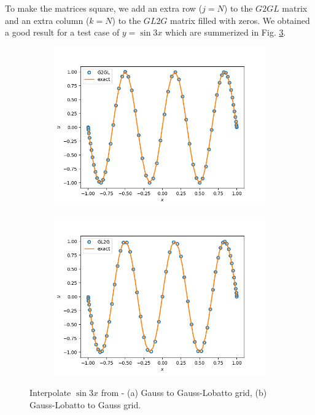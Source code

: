 \documentclass{article}
\begin{document}
To make the matrices square, we add an extra row ($j = N$) to the $G2GL$ matrix and an extra column ($k=N$) to the $GL2G$ matrix filled with zeros. 
We obtained a good result for a test case of $y = \sin{3x}$ which are summerized in Fig. \ref{fig:test_interpolants}.
\begin{figure}[H]
\centering
\begin{subfigure}{.5\textwidth}
  \centering
  \includegraphics[scale=0.4]{Figs/test_g2gl_interpolant.png}
 \subcaption{}
  \label{fig:202a}
\end{subfigure}%
\begin{subfigure}{.5\textwidth}
  \centering
  \includegraphics[scale=0.4]{Figs/test_gl2g_interpolant.png}
  \subcaption{}
  \label{fig:202b}
    \end{subfigure}
  \caption{Interpolate $\sin{3x}$ from - (a) Gauss to Gauss-Lobatto grid,  (b) Gauss-Lobatto to Gauss grid.}
\label{fig:test_interpolants}
\end{figure}
\end{document}
